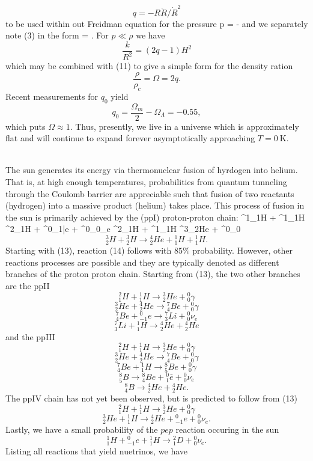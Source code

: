 \documentclass[10pt,letterpaper]{article}
\begin{document}
\[
	q = -R\ddot R/\dot R^2
\]
to be used within out Freidman equation for the pressure
\be
	p = -
\ee
and we separately note (3) in the form
\be
	\rho = .
\ee
For $p\ll \rho$ we have
\[
	\frac{k}{R^2} = (2q-1)H^2
\]
which may be combined with (11) to give a simple form for the density ration
\[
	\frac{\rho}{\rho_c} = \Omega = 2q .
\]
Recent measurements for $q_0$ yield
\[
	q_0 = \frac{\Omega_m}{2}-\Omega_\Lambda = -0.55,
\]
which puts $\Omega \approx 1$.  Thus, presently, we live in a universe which is approximately flat and will continue to expand forever asymptotically approaching $T=0\ \text{K}$. \\ \\
\item
The sun generates its energy via thermonuclear fusion of hyrdogen into helium. That is, at high enough temperatures, probabilities from quantum tunneling through the Coulomb barrier are appreciable such that fusion of two reactants (hydrogen) into a massive product (helium) takes place. This process of fusion in the sun is primarily achieved by the (ppI) proton-proton chain:
\be
	{}^1_1H + {}^1_1H \to {}^2_1H + {}^0_1\bar e + {}^0_0\nu_e
\ee
\be
	{}^2_1H + {}^1_1H \to {}^3_2He + {}^0_0\gamma
\ee
\[
	{}^3_2H + {}^3_2H \to {}^4_2He + {}^1_1H + {}^1_1H.
\]
Starting with (13), reaction (14) follows with $85\%$ probability. However, other reactions processes are possible and they are typically denoted as different branches of the proton proton chain. Starting from (13), the two other branches are the ppII
\[
	{}^2_1H + {}^1_1H \to {}^3_2He + {}^0_0\gamma
\]
\[
	{}^3_2He + {}^4_2He \to {}^7_4Be + {}^0_0\gamma
\]
\[
	{}^7_4Be +  {}^0_{-1} e \to {}^7_3Li + {}^0_0\nu_e
\]
\[
	{}^7_3Li+  {}^1_1 H \to {}^4_2He + {}^4_2He
\]
and the ppIII
\[
	{}^2_1H + {}^1_1H \to {}^3_2He + {}^0_0\gamma
\]
\[
	{}^3_2He + {}^4_2He \to {}^7_4Be + {}^0_0\gamma
\]
\[
	{}^7_4Be +  {}^1_1H \to {}^8_5Be + {}^0_0\gamma
\]
\[
	{}^8_5B  \to {}^8_4Be + {}^0_1\bar e+  {}^0_0\nu_e
\]
\[
	{}^8_4B  \to {}^4_2He+{}^4_2He.
\]
The ppIV chain has not yet been observed, but is predicted to follow from (13)
\[
	{}^2_1H + {}^1_1H \to {}^3_2He + {}^0_0\gamma
\]
\[
	{}^3_2He + {}^1_1H \to {}^4_2He + {}^0_{-1} e+ {}^0_0\nu_e.
\]
Lastly, we have a small probability of the $pep$ reaction occuring in the sun
\[
	{}^1_1H + {}^0_{-1}e + {}^1_1H \to {}^2_1D+ {}^0_0 \nu_e.
\]
Listing all reactions that yield nuetrinos, we have
\end{document}
